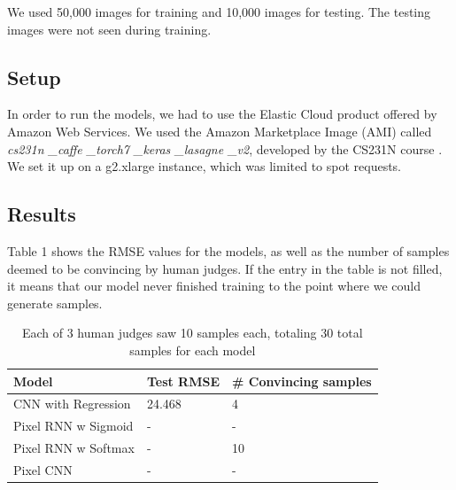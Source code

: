 \documentclass[10pt,twocolumn,letterpaper]{article}
\begin{document}
We used 50,000 images for training and 10,000 images for testing. The testing images were not seen during training.

\subsection{Setup}
In order to run the models, we had to use the Elastic Cloud product offered by Amazon Web Services. We used the Amazon Marketplace Image (AMI) called \textit{cs231n \_caffe \_torch7 \_keras \_lasagne \_v2}, developed by the CS231N course \cite{aws_tutorial}. We set it up on a g2.xlarge instance, which was limited to spot requests. 

\subsection{Results}
Table 1 shows the RMSE values for the models, as well as the number of samples deemed to be convincing by human judges. If the entry in the table is not filled, it means that our model never finished training to the point where we could generate samples.
\begin{table}[!ht]
\centering
\caption{Each of 3 human judges saw 10 samples each, totaling 30 total samples for each model}
\begin{tabular}{lll}
\hline
Model               & Test RMSE & \# Convincing samples \\ \hline
CNN with Regression & 24.468    &  4                     \\
Pixel RNN w Sigmoid &   -       &  -                     \\
Pixel RNN w Softmax &   -       &  10                     \\
Pixel CNN           &   -       &  -                     \\ \hline
\end{tabular}
\end{table}
\end{document}
